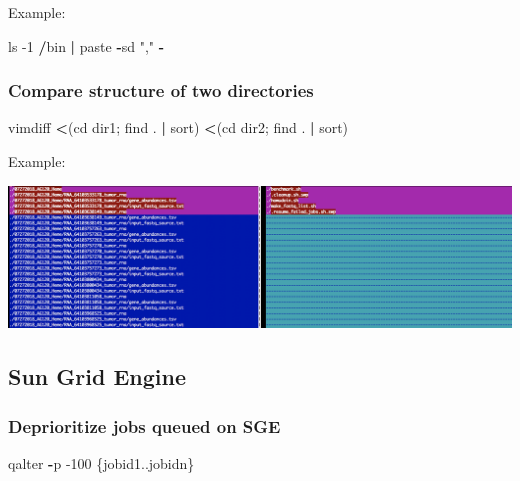 \documentclass[openany]{book}
\newenvironment{Shaded}{\begin{snugshade}}{\end{snugshade}}
\newcommand{\DecValTok}[1]{\textcolor[rgb]{0.00,0.00,0.81}{#1}}
\newcommand{\NormalTok}[1]{#1}
\newcommand{\OperatorTok}[1]{\textcolor[rgb]{0.81,0.36,0.00}{\textbf{#1}}}
\newcommand{\StringTok}[1]{\textcolor[rgb]{0.31,0.60,0.02}{#1}}
\begin{document}
Example:

\begin{Shaded}
\begin{Highlighting}[]
\NormalTok{ls }\DecValTok{-1} \OperatorTok{/}\NormalTok{bin }\OperatorTok{|}\StringTok{ }\NormalTok{paste }\OperatorTok{-}\NormalTok{sd }\StringTok{","} \OperatorTok{-}
\end{Highlighting}
\end{Shaded}

\hypertarget{compare-structure-of-two-directories}{%
\subsubsection{Compare structure of two directories}\label{compare-structure-of-two-directories}}

\begin{Shaded}
\begin{Highlighting}[]
\NormalTok{vimdiff }\OperatorTok{<}\NormalTok{(cd dir1; find . }\OperatorTok{|}\StringTok{ }\NormalTok{sort) }\OperatorTok{<}\NormalTok{(cd dir2; find . }\OperatorTok{|}\StringTok{ }\NormalTok{sort)}
\end{Highlighting}
\end{Shaded}

Example:

\includegraphics[width=1.3\linewidth]{images/vimdiff}

\hypertarget{sun-grid-engine}{%
\subsection{Sun Grid Engine}\label{sun-grid-engine}}

\hypertarget{deprioritize-jobs-queued-on-sge}{%
\subsubsection{Deprioritize jobs queued on SGE}\label{deprioritize-jobs-queued-on-sge}}

\begin{Shaded}
\begin{Highlighting}[]
\NormalTok{qalter }\OperatorTok{-}\NormalTok{p }\DecValTok{-100}\NormalTok{ \{jobid1..jobidn\}}
\end{Highlighting}
\end{Shaded}
\end{document}
